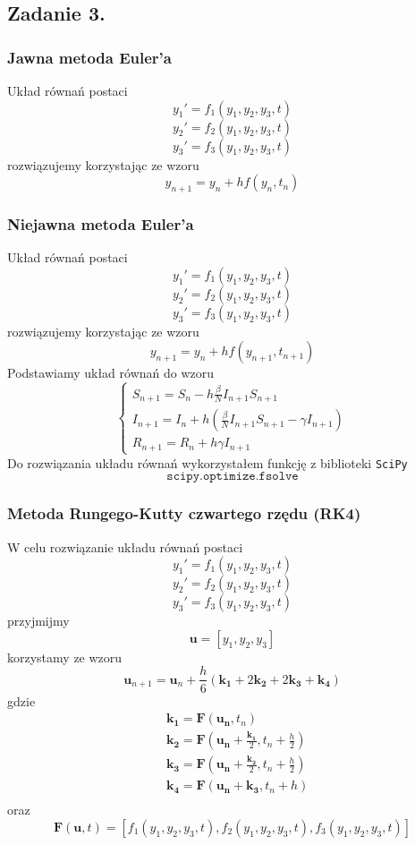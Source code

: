 \documentclass[11pt, leqno]{scrartcl}
\begin{document}
    \subsection{Zadanie 3.}
    \subsubsection{Jawna metoda Euler'a}
    Układ równań postaci
    \[
        y_1'=f_1(y_1,y_2,y_3,t)
    \]
    \[
        y_2'=f_2(y_1,y_2,y_3,t)
    \]
    \[
        y_3'=f_3(y_1,y_2,y_3,t)
    \]
    rozwiązujemy korzystając ze wzoru
    \[
        y_{n+1}=y_n+hf(y_n,t_n)
    \]
    \subsubsection{Niejawna metoda Euler'a}
    Układ równań postaci
    \[
        y_1'=f_1(y_1,y_2,y_3,t)
    \]
    \[
        y_2'=f_2(y_1,y_2,y_3,t)
    \]
    \[
        y_3'=f_3(y_1,y_2,y_3,t)
    \]
    rozwiązujemy korzystając ze wzoru
    \[
        y_{n+1}=y_n+hf(y_{n+1}, t_{n+1})
    \]
    Podstawiamy układ równań do wzoru
    \[
        \begin{cases}
            S_{n+1}=S_n-h\frac{\beta}{N}I_{n+1}S_{n+1} \\
            I_{n+1}=I_n+h \left( \frac{\beta}{N}I_{n+1}S_{n+1}
                -\gamma I_{n+1} \right) \\
            R_{n+1}=R_n+h\gamma I_{n+1}
        \end{cases}
    \]
    Do rozwiązania układu równań wykorzystałem funkcję z biblioteki
    \texttt{SciPy}
    \[
        \texttt{scipy.optimize.fsolve}
    \]
    \subsubsection{Metoda Rungego-Kutty czwartego rzędu (RK4)}
    W celu rozwiązanie układu równań postaci
    \[
        y_1'=f_1(y_1,y_2,y_3,t)
    \]
    \[
        y_2'=f_2(y_1,y_2,y_3,t)
    \]
    \[
        y_3'=f_3(y_1,y_2,y_3,t)
    \]
    przyjmijmy
    \[
        \mathbf{u}=[y_1,y_2,y_3]
    \]
    korzystamy ze wzoru
    \[
        \mathbf{u}_{n+1}=\mathbf{u}_n+\frac{h}{6}(\mathbf{k_1}+
            2\mathbf{k_2}+2\mathbf{k_3}+\mathbf{k_4})
    \]
    gdzie
    \begin{align*}
        &\mathbf{k_1}=\mathbf{F}(\mathbf{u_n}, t_n) \\
        &\mathbf{k_2}=\mathbf{F} \left( \mathbf{u_n}+\frac{\mathbf{k_1}}{2},
            t_n+\frac{h}{2} \right) \\
        &\mathbf{k_3}=\mathbf{F} \left( \mathbf{u_n}+\frac{\mathbf{k_2}}{2},
            t_n+\frac{h}{2} \right) \\
        &\mathbf{k_4}=\mathbf{F} \left( \mathbf{u_n}+\mathbf{k_3},
            t_n+h \right) \\
    \end{align*}
    oraz
    \[
        \mathbf{F}(\mathbf{u},t)=[f_1(y_1,y_2,y_3,t),f_2(y_1,y_2,y_3,t),
            f_3(y_1,y_2,y_3,t)]
    \]
\end{document}
